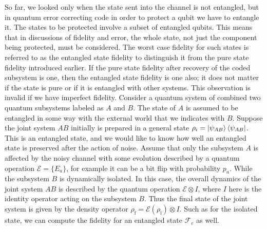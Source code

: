 So far, we looked only when the state sent into the channel is not entangled, but in quantum error correcting code in order to protect a qubit we have to entangle it. 
The states to be protected involve a subset of entangled qubits. This means that in discussions of fidelity and error, the whole state, not just the component being protected, must be considered.
The worst case fidelity for such states is referred to as the entangled state fidelity to distinguish it from the pure state fidelity introduced earlier.
If the pure state fidelity after recovery of the coded subsystem is one, then the entangled state fidelity is one also; it does not matter if the state is pure or if it is entangled with other systems. This observation is invalid if we have imperfect fidelity.
Consider a quantum system of combined two quantum subsystems labeled
as $A$ and $B$. The state of $A$ is assumed to be entangled in some way with the external world that we indicates with $B$. Suppose the joint system $AB$ initially is prepared in a general state $\rho_{i}=\ket{\psi_{AB}}\bra{\psi_{AB}}$. This is an entangled state, and we would like to know how well an entangled state is preserved after the action of noise.
Assume that only the subsystem $A$ is affected by the noisy channel with
some evolution described by a quantum operation $\mathcal{E} = \{E_a\}$, for example it can be a bit flip with probability $p_a$. While the subsystem $B$
is dynamically isolated. In this case, the overall dynamics of the joint system $AB$ is described by the quantum operation $\mathcal{E} \otimes I$, where $I$ here is the identity operator acting on the subsystem $B$. Thus the final state of the joint system is given by the density operator $\rho_{\mathrm{f}}= \mathcal{E}\left(\rho_{\mathrm{i}}\right) \otimes I $.
Such as for the isolated state, we can compute the fidelity for an entangled state $\mathcal{F}_e$ as well.
